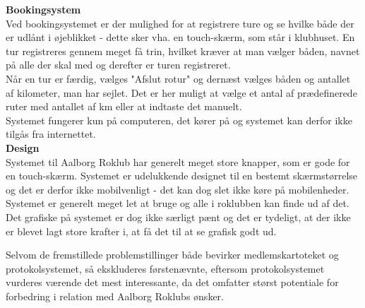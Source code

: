 {\bf Bookingsystem}\\
Ved bookingsystemet er der mulighed for at registrere ture og se hvilke både der er udlånt i øjeblikket - dette sker vha. en touch-skærm, som står i klubhuset. En tur registreres gennem meget få trin, hvilket kræver at man vælger båden, navnet på alle der skal med og derefter er turen registreret.\\

Når en tur er færdig, vælges "Afslut rotur" og dernæst vælges båden og antallet af kilometer, man har sejlet. Det er her muligt at vælge et antal af prædefinerede ruter med antallet af km eller at indtaste det manuelt.\\

Systemet fungerer kun på computeren, det kører på og systemet kan derfor ikke tilgås fra internettet.\\

{\bf Design}\\
Systemet til Aalborg Roklub har generelt meget store knapper, som er gode for en touch-skærm. Systemet er udelukkende designet til en bestemt skærmstørrelse og det er derfor ikke mobilvenligt - det kan dog slet ikke køre på mobilenheder.\\

Systemet er generelt meget let at bruge og alle i roklubben kan finde ud af det. Det grafiske på systemet er dog ikke særligt pænt og det er tydeligt, at der ikke er blevet lagt store krafter i, at få det til at se grafisk godt ud.


Selvom de fremstillede problemstillinger både bevirker medlemskartoteket og protokolsystemet, så ekskluderes førstenævnte, eftersom protokolsystemet vurderes værende det mest interessante, da det omfatter størst potentiale for forbedring i relation med Aalborg Roklubs ønsker.

